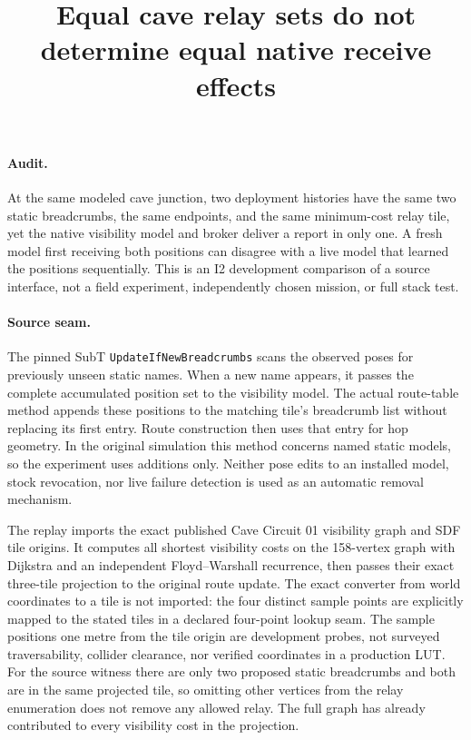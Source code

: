 \documentclass{article}
\title{Equal cave relay sets do not determine equal native receive effects}
\author{}
\date{}
\begin{document}
\maketitle

\paragraph{Audit.}
At the same modeled cave junction, two deployment histories have
the same two static breadcrumbs, the same endpoints, and the same
minimum-cost relay tile, yet the native visibility model and broker
deliver a report in only one. A fresh model first receiving both
positions can disagree with a live model that learned the positions
sequentially. This is an I2 development comparison of a source
interface, not a field experiment, independently chosen mission, or
full stack test.

\paragraph{Source seam.}
The pinned SubT \texttt{UpdateIfNewBreadcrumbs} scans the observed
poses for previously unseen static names. When a new name appears,
it passes the complete accumulated position set to the visibility
model. The actual route-table method appends these positions to the
matching tile's breadcrumb list without replacing its first entry.
Route construction then uses that entry for hop geometry.
In the original simulation this method concerns named static
models, so the experiment uses additions only. Neither pose edits
to an installed model, stock revocation, nor live failure detection
is used as an automatic removal mechanism.

The replay imports the exact published Cave Circuit 01 visibility
graph and SDF tile origins. It computes all shortest visibility
costs on the 158-vertex graph with Dijkstra and an independent
Floyd--Warshall recurrence, then passes their exact three-tile
projection to the original route update. The exact converter from
world coordinates to a tile is not imported: the four distinct
sample points are explicitly mapped to the stated tiles in a
declared four-point lookup seam. The sample positions one metre
from the tile origin are development probes, not surveyed
traversability, collider clearance, nor verified coordinates in a
production LUT. For the source witness there are only two proposed
static breadcrumbs and both are in the same projected tile, so
omitting other vertices from the relay enumeration does not remove
any allowed relay. The full graph has already contributed to every
visibility cost in the projection.
\end{document}
